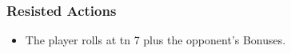 \subsubsection{Resisted Actions}

\begin{itemize}
  \item
  The player rolls at \gls{tn} 7 plus the opponent's Bonuses.
\end{itemize}
